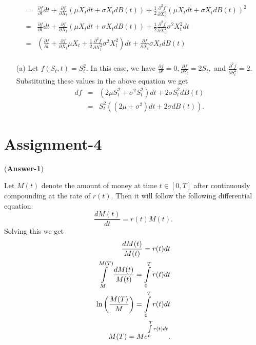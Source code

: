 \documentclass[11pt,twoside,reqno]{article}
\newcommand{\s}{\sigma}
\newcommand{\p}{\partial}
\begin{document}
\begin{itemize}
\begin{eqnarray*}
&=& \frac{\p f}{\p t} dt + \frac{\p f}{\p X_t} (\mu X_t dt + \s X_t dB(t)) + \frac{1}{2} \frac{\p^2 f}{\p X_t^2} (\mu X_t dt + \s X_t dB(t))^2 \\
&=& \frac{\p f}{\p t} dt + \frac{\p f}{\p X_t} (\mu X_t dt + \s X_t dB(t)) + \frac{1}{2} \frac{\p^2 f}{\p X_t^2} \s^2 X_t^2 dt \\
&=& \left( \frac{\p f}{\p t} + \frac{\p f}{\p X_t} \mu X_t + \frac{1}{2} \frac{\p^2 f}{\p X_t^2} \s^2 X_t^2 \right)dt + \frac{\p f}{\p X_t}  \s X_t dB(t)\\
\end{eqnarray*}
\begin{enumerate}
\item[(a)] Let $f(S_t, t) = S_t^2.$ In this case, we have $\frac{\p f}{\p t} = 0, \frac{\p f}{\p S_t} = 2S_t,$ and $ \frac{\p^2 f}{\p S_t^2} = 2$. Substituting these values in the above 
equation we get 
\begin{eqnarray*}
df &=&  (2\mu S_t^2 + \s^2 S_t^2 )dt + 2\s S_t^2 dB(t) \\
&=& S_t^2((2\mu + \s^2)dt + 2 \s dB(t)).
\end{eqnarray*}
\end{enumerate}
\end{itemize}




\section{Assignment-4}

({\bf Answer-1})

Let $M(t)$ denote the amount of money at time $t \in [0, T]$ after continuously compounding at the rate of $r(t)$. Then it will follow the following differential equation:
\[
\frac{dM(t)}{dt} = r(t) M(t).
\]
Solving this we get
\begin{eqnarray*}
\frac{dM(t)}{M(t)} = r(t) dt \\
\int\limits_{M}^{M(T)} \frac{dM(t)}{M(t)} = \int\limits_{0}^T r(t) dt \\
{\rm ln}\left(\frac{M(T)}{M}\right) = \int\limits_{0}^T r(t) dt \\
M(T) = M e^{\int\limits_{0}^T r(t) dt}.
\end{eqnarray*}
\end{document}
